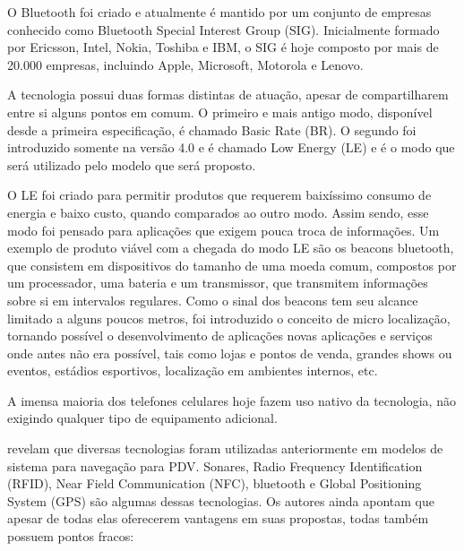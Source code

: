 \documentclass[english,brazilian]{UNISINOSmonografia}
\begin{document}
O Bluetooth foi criado e atualmente é mantido por um conjunto de empresas conhecido como Bluetooth Special Interest Group (SIG). Inicialmente formado por Ericsson, Intel, Nokia, Toshiba e IBM, o SIG é hoje composto por mais de 20.000 empresas, incluindo Apple, Microsoft, Motorola e Lenovo.

A tecnologia possui duas formas distintas de atuação, apesar de compartilharem entre si alguns pontos em comum. O primeiro e mais antigo modo, disponível desde a primeira especificação, é chamado Basic Rate (BR). O segundo foi introduzido somente na versão 4.0 e é chamado Low Energy (LE) e é o modo que será utilizado pelo modelo que será proposto.

O LE foi criado para permitir produtos que requerem baixíssimo consumo de energia e baixo custo, quando comparados ao outro modo. Assim sendo, esse modo foi pensado para aplicações que exigem pouca troca de informações. Um exemplo de produto viável com a chegada do modo LE são os beacons bluetooth, que consistem em dispositivos do tamanho de uma moeda comum, compostos por um processador, uma bateria e um transmissor, que transmitem informações sobre si em intervalos regulares. Como o sinal dos beacons tem seu alcance limitado a alguns poucos metros, foi introduzido o conceito de micro localização, tornando possível o desenvolvimento de aplicações novas aplicações e serviços onde antes não era possível, tais como lojas e pontos de venda, grandes shows ou eventos, estádios esportivos, localização em ambientes internos, etc.

A imensa maioria dos telefones celulares hoje fazem uso nativo da tecnologia, não exigindo qualquer tipo de equipamento adicional.

 revelam que diversas tecnologias foram utilizadas anteriormente em modelos de sistema para navegação para PDV. Sonares, Radio Frequency Identification (RFID), Near Field Communication (NFC), bluetooth e Global Positioning System (GPS) são algumas dessas tecnologias. Os autores ainda apontam que apesar de todas elas oferecerem vantagens em suas propostas, todas também possuem pontos fracos:
\end{document}
